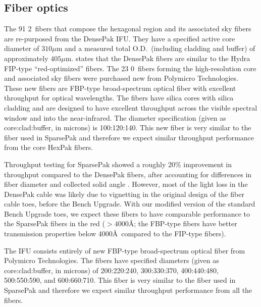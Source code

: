 \subsection{Fiber optics}
\label{GPBsub:sec:fibers}
The 91 2\ fibers that compose the hexagonal region and its associated
sky fibers are re-purposed from the DensePak IFU.  They have a specified
active core diameter of $310\mu$m and a measured total O.D.\ (including
cladding and buffer) of approximately $405\mu$m. \citet{Barden98}
states that the DensePak fibers are similar to the Hydra FIP-type
``red-optimized'' fibers.  The 23 0\ fibers forming the
high-resolution core and associated sky fibers were purchased new from
Polymicro Technologies.  These new fibers are FBP-type broad-spectrum optical
fiber with excellent throughput for optical wavelengths.  The fibers have
silica cores with silica cladding and are designed to have excellent
throughput across the visible spectral window and into the near-infrared.  The
diameter specification (given as core:clad:buffer, in microns) is 100:120:140.
This new fiber is very similar to the fiber used in SparsePak and therefore we
expect similar throughput performance from the core HexPak fibers.

Throughput testing for SparsePak showed a roughly 20\% improvement in
throughput compared to the DensePak fibers, after accounting for differences
in fiber diameter and collected solid angle \citep{Bershady05}.  However, most
of the light loss in the DensePak cable was likely due to vignetting in the
original design of the fiber cable toes, before the Bench Upgrade.  With our
modified version of the standard Bench Upgrade toes, we expect these fibers to
have comparable performance to the SparsePak fibers in the red ($>4000$\AA;
the FBP-type fibers have better transmission properties below
4000\AA\ compared to the FIP-type fibers).

The \GP IFU consists entirely of new FBP-type broad-spectrum optical fiber
from Polymicro Technologies.  The fibers have specified diameters (given as
core:clad:buffer, in microns) of 200:220:240, 300:330:370, 400:440:480,
500:550:590, and 600:660:710.  This fiber is very similar to the fiber used in
SparsePak and therefore we expect similar throughput performance from all the
\GP fibers.


